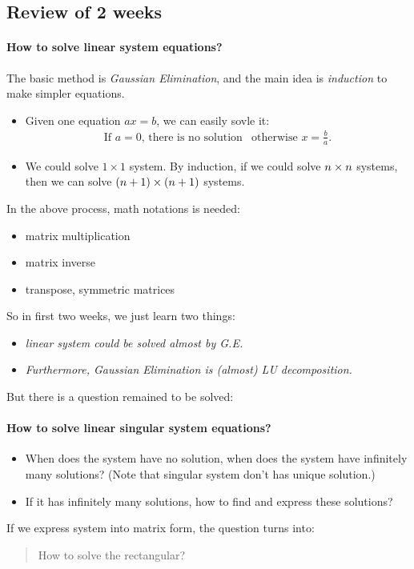 \subsection{Review of 2 weeks}
\paragraph{How to solve linear system equations?}
The basic method is \emph{Gaussian Elimination}, and the main idea is \textit{induction} to make simpler equations.
\begin{itemize}
\item
Given one equation $ax=b$, we can easily sovle it:
\[
\begin{array}{ll}
\mbox{If $a=0$, there is no solution}
&
\mbox{otherwise $x=\frac{b}{a}$}.
\end{array}
\]
\item
We could solve $1\times 1$ system. By induction, if we could solve $n\times n$ systems, then we can solve $(n+1)\times(n+1)$ systems.
\end{itemize}

In the above process, math notations is needed:
\begin{itemize}
\item
matrix multiplication
\item
matrix inverse
\item
transpose, symmetric matrices
\end{itemize}
So in first two weeks, we just learn two things:
\begin{itemize}
\item
\textit{linear system could be solved \emph{almost} by G.E.}
\item
\textit{Furthermore, Gaussian Elimination is (almost) LU decomposition.}
\end{itemize}
But there is a question remained to be solved:
\paragraph{How to solve linear singular system equations?}
\begin{itemize}
\item
When does the system have no solution, when does the system have infinitely many solutions? (Note that singular system don't has unique solution.)
\item
If it has infinitely many solutions, how to find and express these solutions?
\end{itemize}
If we express system into matrix form, the question turns into:
\begin{quotation}
How to solve the rectangular?
\end{quotation}

